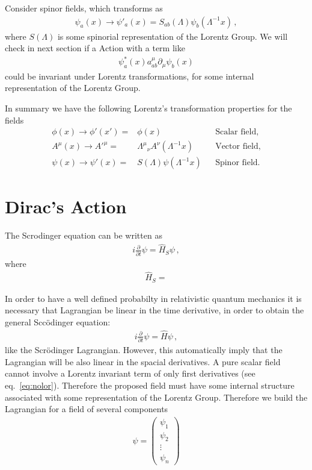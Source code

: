 Consider spinor fields, which transforms as
\begin{align}
\label{eq:184qft}
  \psi_a(x)\to\psi'_a(x)=S_{ab}(\Lambda)\psi_b(\Lambda^{-1}x)\,, 
\end{align}
where $S(\Lambda)$ is some spinorial representation of the Lorentz Group. We will check in next section if a Action with a term like
\begin{align}
  \psi^*_a(x)a^\mu_{ab}\partial_\mu\psi_b(x)
\end{align}
could be invariant under Lorentz transformations, for some internal representation of the Lorentz Group.

In summary we have the following Lorentz's transformation properties for the fields
\begin{align}
   \phi(x)\to \phi'(x')=&\phi(x) && \text{Scalar field,}\nonumber\\
   A^\mu(x)\to {A'}^\mu=&{\Lambda^\mu}_\nu A^\nu(\Lambda^{-1}x)&&\text{Vector field,}\nonumber\\
   \psi(x)\to\psi'(x)=&S(\Lambda)\psi(\Lambda^{-1}x)&&\text{Spinor field.}
\end{align}

\section{Dirac's Action}
\label{sec:dirac-equation}
The Scrodinger equation can be written as
\begin{align}
    i\frac{\partial}{\partial t}\psi=\hat{H}_{S} \psi\,,  
\end{align}
where
\begin{align}
  \hat{H}_{S}=
\end{align}


In order to have a well defined probabilty in relativistic quantum mechanics it is necessary that Lagrangian be linear in the time derivative, in order to obtain the general Sccödinger equation:
\begin{align}
  i\frac{\partial}{\partial t}\psi=\hat{H} \psi\,,  
\end{align}
like the Scrödinger Lagrangian. However, this automatically imply that the Lagrangian will be also linear in the spacial derivatives. A pure scalar field cannot involve a Lorentz invariant term of only first derivatives (see eq.~\eqref{eq:nolor}). Therefore the proposed field must have some internal structure associated with some representation of the Lorentz Group. Therefore we build the Lagrangian for a field of several components
\begin{align}
  \psi=  \begin{pmatrix}
\psi_1\\
\psi_2\\
\vdots\\
\psi_n    
  \end{pmatrix}
\end{align}

